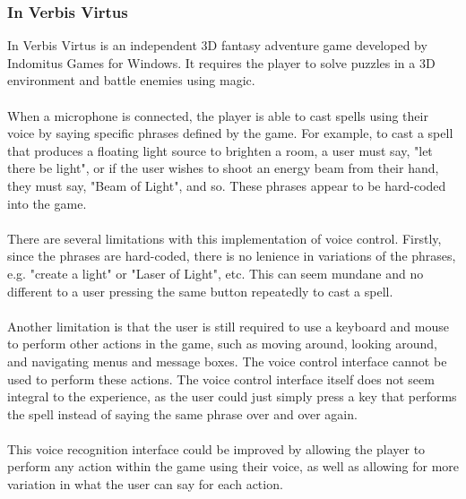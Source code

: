 \documentclass[12pt]{article}
\begin{document}
\subsubsection{In Verbis Virtus}
In Verbis Virtus \cite{RefWorks:22} is an independent 3D fantasy adventure game developed by Indomitus Games for Windows. It requires the player to solve puzzles in a 3D environment and battle enemies using magic.
\\
\\
When a microphone is connected, the player is able to cast spells using their voice by saying specific phrases defined by the game. For example, to cast a spell that produces a floating light source to brighten a room, a user must say, "let there be light", or if the user wishes to shoot an energy beam from their hand, they must say, "Beam of Light", and so. These phrases appear to be hard-coded into the game.
\\
\\
There are several limitations with this implementation of voice control. Firstly, since the phrases are hard-coded, there is no lenience in variations of the phrases, e.g. "create a light" or "Laser of Light", etc. This can seem mundane and no different to a user pressing the same button repeatedly to cast a spell.
\\
\\
Another limitation is that the user is still required to use a keyboard and mouse to perform other actions in the game, such as moving around, looking around, and navigating menus and message boxes. The voice control interface cannot be used to perform these actions. The voice control interface itself does not seem integral to the experience, as the user could just simply press a key that performs the spell instead of saying the same phrase over and over again.
\\
\\
This voice recognition interface could be improved by allowing the player to perform any action within the game using their voice, as well as allowing for more variation in what the user can say for each action.
\end{document}
